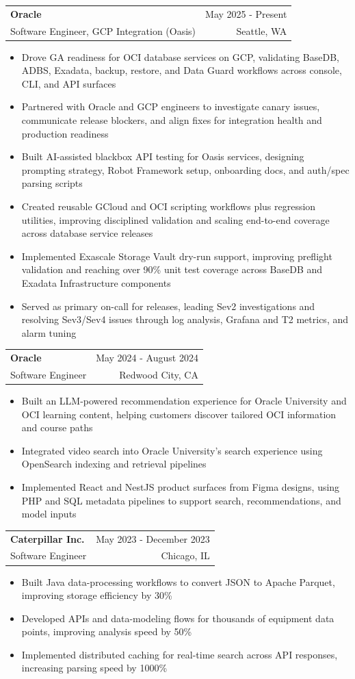 \documentclass[letterpaper,11pt]{article}
\makeatletter
\newcommand{\resumeItem}[1]{
  \item\small{
    {#1 \vspace{-1pt}}
  }
}
\newcommand{\resumeSubheading}[4]{
  \vspace{-2pt}\item
    \begin{tabular*}{0.97\textwidth}[t]{l@{\extracolsep{\fill}}r}
      \textbf{#1} & #2 \\
      {\small#3} & {\small #4} \\
    \end{tabular*}\vspace{-7pt}
}
\newcommand{\resumeItemListStart}{\begin{itemize}[leftmargin=0.18in,itemsep=1pt,topsep=2pt]}
\newcommand{\resumeItemListEnd}{\end{itemize}\vspace{-5pt}}
\makeatother
\begin{document}
    \resumeSubheading
  {Oracle}{May 2025 - Present}
  {Software Engineer, GCP Integration (Oasis)}{Seattle, WA}
  \resumeItemListStart
    \resumeItem{Drove GA readiness for OCI database services on GCP, validating BaseDB, ADBS, Exadata, backup, restore, and Data Guard workflows across console, CLI, and API surfaces}
    \resumeItem{Partnered with Oracle and GCP engineers to investigate canary issues, communicate release blockers, and align fixes for integration health and production readiness}
    \resumeItem{Built AI-assisted blackbox API testing for Oasis services, designing prompting strategy, Robot Framework setup, onboarding docs, and auth/spec parsing scripts}
    \resumeItem{Created reusable GCloud and OCI scripting workflows plus regression utilities, improving disciplined validation and scaling end-to-end coverage across database service releases}
    \resumeItem{Implemented Exascale Storage Vault dry-run support, improving preflight validation and reaching over 90\% unit test coverage across BaseDB and Exadata Infrastructure components}
    \resumeItem{Served as primary on-call for releases, leading Sev2 investigations and resolving Sev3/Sev4 issues through log analysis, Grafana and T2 metrics, and alarm tuning}
  \resumeItemListEnd

    \resumeSubheading
      {Oracle}{May 2024 - August 2024}
      {Software Engineer}{Redwood City, CA}
      \resumeItemListStart
        \resumeItem{Built an LLM-powered recommendation experience for Oracle University and OCI learning content, helping customers discover tailored OCI information and course paths}
        \resumeItem{Integrated video search into Oracle University's search experience using OpenSearch indexing and retrieval pipelines}
        \resumeItem{Implemented React and NestJS product surfaces from Figma designs, using PHP and SQL metadata pipelines to support search, recommendations, and model inputs}
      \resumeItemListEnd

    \resumeSubheading
      {Caterpillar Inc.}{May 2023 - December 2023}
      {Software Engineer}{Chicago, IL}
      \resumeItemListStart
        \resumeItem{Built Java data-processing workflows to convert JSON to Apache Parquet, improving storage efficiency by 30\%}
        \resumeItem{Developed APIs and data-modeling flows for thousands of equipment data points, improving analysis speed by 50\%}
        \resumeItem{Implemented distributed caching for real-time search across API responses, increasing parsing speed by 1000\%}
      \resumeItemListEnd
\end{document}
